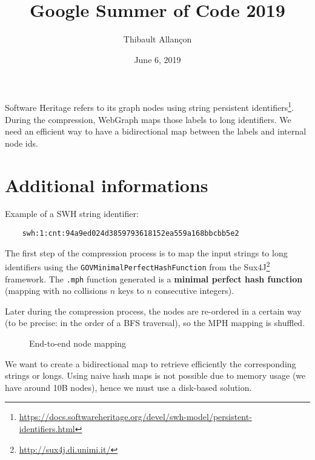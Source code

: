 \documentclass[11pt,a4paper]{article}
\title{Google Summer of Code 2019}
\author{Thibault Allançon}
\date{June 6, 2019}
\begin{document}
\maketitle

Software Heritage refers to its graph nodes using string persistent
identifiers\footnote{\url{https://docs.softwareheritage.org/devel/swh-model/persistent-identifiers.html}}.
During the compression, WebGraph maps those labels to long identifiers. We need
an efficient way to have a bidirectional map between the labels and internal
node ids.

\section{Additional informations}

Example of a SWH string identifier:

\begin{verbatim}
    swh:1:cnt:94a9ed024d3859793618152ea559a168bbcbb5e2
\end{verbatim}

The first step of the compression process is to map the input strings to long
identifiers using the \texttt{GOVMinimalPerfectHashFunction} from the
Sux4J\footnote{\url{http://sux4j.di.unimi.it/}} framework. The
\texttt{.mph} function generated is a \textbf{minimal perfect hash
function} (mapping with no collisions $n$ keys to $n$ consecutive integers).

Later during the compression process, the nodes are re-ordered in a certain way
(to be precise: in the order of a BFS traversal), so the MPH mapping is
shuffled.

\begin{figure}[H]
    \centering
    \caption{End-to-end node mapping}
\end{figure}

We want to create a bidirectional map to retrieve efficiently the corresponding
strings or longs. Using naive hash maps is not possible due to memory usage (we
have around 10B nodes), hence we must use a disk-based solution.
\end{document}
